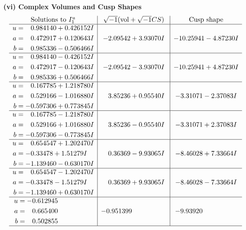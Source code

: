 \documentclass[1p]{elsarticle_modified}
\theoremstyle{definition}
\newcommand{\I}{\sqrt{-1}}
\begin{document}
\newpage\flushleft \textbf{(vi) Complex Volumes and Cusp Shapes}
$$\begin{array}{c|c|c}  
\text{Solutions to }I^u_{1}& \I (\text{vol} + \sqrt{-1}CS) & \text{Cusp shape}\\
 \hline 
\begin{aligned}
u &= \phantom{-}0.984140 + 0.426152 I \\
a &= \phantom{-}0.472917 + 0.120643 I \\
b &= \phantom{-}0.985336 - 0.506466 I\end{aligned}
 & -2.09542 + 3.93070 I & -10.25941 - 4.87230 I \\ \hline\begin{aligned}
u &= \phantom{-}0.984140 - 0.426152 I \\
a &= \phantom{-}0.472917 - 0.120643 I \\
b &= \phantom{-}0.985336 + 0.506466 I\end{aligned}
 & -2.09542 - 3.93070 I & -10.25941 + 4.87230 I \\ \hline\begin{aligned}
u &= \phantom{-}0.167785 + 1.218780 I \\
a &= \phantom{-}0.529166 - 1.016880 I \\
b &= -0.597306 + 0.773845 I\end{aligned}
 & \phantom{-}3.85236 + 0.95540 I & -3.31071 - 2.37083 I \\ \hline\begin{aligned}
u &= \phantom{-}0.167785 - 1.218780 I \\
a &= \phantom{-}0.529166 + 1.016880 I \\
b &= -0.597306 - 0.773845 I\end{aligned}
 & \phantom{-}3.85236 - 0.95540 I & -3.31071 + 2.37083 I \\ \hline\begin{aligned}
u &= \phantom{-}0.654547 + 1.202470 I \\
a &= -0.33478 + 1.51279 I \\
b &= -1.139460 - 0.630170 I\end{aligned}
 & \phantom{-}0.36369 - 9.93065 I & -8.46028 + 7.33664 I \\ \hline\begin{aligned}
u &= \phantom{-}0.654547 - 1.202470 I \\
a &= -0.33478 - 1.51279 I \\
b &= -1.139460 + 0.630170 I\end{aligned}
 & \phantom{-}0.36369 + 9.93065 I & -8.46028 - 7.33664 I \\ \hline\begin{aligned}
u &= -0.612945\phantom{ +0.000000I} \\
a &= \phantom{-}0.665400\phantom{ +0.000000I} \\
b &= \phantom{-}0.502855\phantom{ +0.000000I}\end{aligned}
 & -0.951399\phantom{ +0.000000I} & -9.93920\phantom{ +0.000000I}\\
 \hline 
 \end{array}$$\newpage\newpage\renewcommand{\arraystretch}{1}
\end{document}
